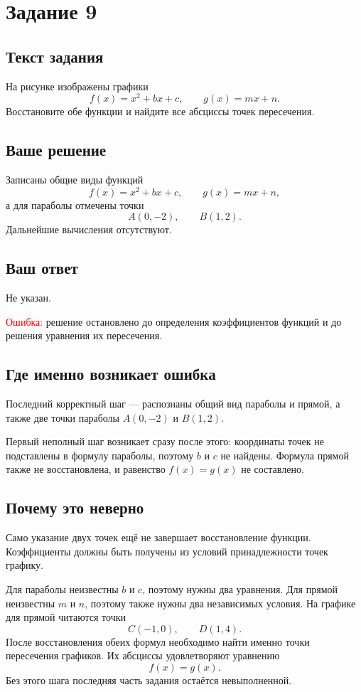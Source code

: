 \documentclass[12pt,a4paper]{article}
\begin{document}
\newpage
{}\label{task:9}
\section*{Задание 9}

\subsection*{Текст задания}
На рисунке изображены графики
\[
  f(x)=x^2+bx+c, \qquad g(x)=mx+n.
\]
Восстановите обе функции и найдите все абсциссы точек пересечения.

\subsection*{Ваше решение}
Записаны общие виды функций
\[
  f(x)=x^2+bx+c, \qquad g(x)=mx+n,
\]
а для параболы отмечены точки
\[
  A(0,-2), \qquad B(1,2).
\]
Дальнейшие вычисления отсутствуют.

\subsection*{Ваш ответ}
Не указан.

\textcolor{red}{Ошибка:} решение остановлено до определения коэффициентов функций и до решения уравнения их пересечения.

\subsection*{Где именно возникает ошибка}
Последний корректный шаг --- распознаны общий вид параболы и прямой, а также две точки параболы \(A(0,-2)\) и \(B(1,2)\).

Первый неполный шаг возникает сразу после этого: координаты точек не подставлены в формулу параболы, поэтому \(b\) и \(c\) не найдены. Формула прямой также не восстановлена, и равенство \(f(x)=g(x)\) не составлено.

\subsection*{Почему это неверно}
Само указание двух точек ещё не завершает восстановление функции. Коэффициенты должны быть получены из условий принадлежности точек графику.

Для параболы неизвестны \(b\) и \(c\), поэтому нужны два уравнения. Для прямой неизвестны \(m\) и \(n\), поэтому также нужны два независимых условия. На графике для прямой читаются точки
\[
  C(-1,0), \qquad D(1,4).
\]
После восстановления обеих формул необходимо найти именно точки пересечения графиков. Их абсциссы удовлетворяют уравнению
\[
  f(x)=g(x).
\]
Без этого шага последняя часть задания остаётся невыполненной.
\end{document}
